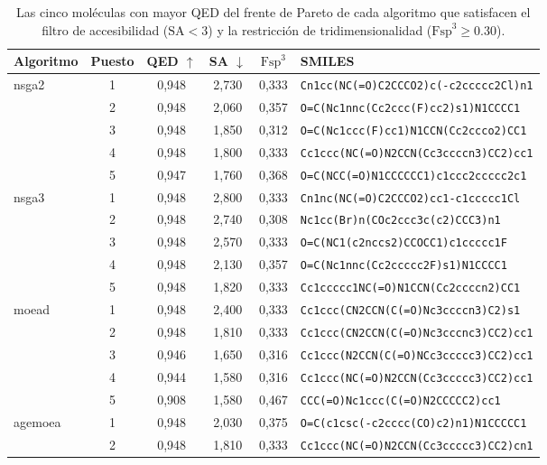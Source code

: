 \begin{table}[H]
\centering
\caption{Las cinco moléculas con mayor QED del frente de Pareto de cada algoritmo que satisfacen el filtro de accesibilidad ($\text{SA} < 3$) y la restricción de tridimensionalidad ($\text{Fsp}^3 \ge 0.30$).}
\label{tab:moleculas_representativas_completo}
\begin{tabular}{lccccl}
\toprule
Algoritmo & Puesto & QED $\uparrow$ & SA $\downarrow$ & $\text{Fsp}^3$ & SMILES \\
\midrule
\multirow{5}{*}{\acrshort{nsga2}}
 & 1 & 0,948 & 2,730 & 0,333 & \texttt{Cn1cc(NC(=O)C2CCCO2)c(-c2ccccc2Cl)n1} \\
 & 2 & 0,948 & 2,060 & 0,357 & \texttt{O=C(Nc1nnc(Cc2ccc(F)cc2)s1)N1CCCC1} \\
 & 3 & 0,948 & 1,850 & 0,312 & \texttt{O=C(Nc1ccc(F)cc1)N1CCN(Cc2ccco2)CC1} \\
 & 4 & 0,948 & 1,800 & 0,333 & \texttt{Cc1ccc(NC(=O)N2CCN(Cc3ccccn3)CC2)cc1} \\
 & 5 & 0,947 & 1,760 & 0,368 & \texttt{O=C(NCC(=O)N1CCCCCC1)c1ccc2ccccc2c1} \\
\midrule
\multirow{5}{*}{\acrshort{nsga3}}
 & 1 & 0,948 & 2,800 & 0,333 & \texttt{Cn1nc(NC(=O)C2CCCO2)cc1-c1ccccc1Cl} \\
 & 2 & 0,948 & 2,740 & 0,308 & \texttt{Nc1cc(Br)n(COc2ccc3c(c2)CCC3)n1} \\
 & 3 & 0,948 & 2,570 & 0,333 & \texttt{O=C(NC1(c2nccs2)CCOCC1)c1ccccc1F} \\
 & 4 & 0,948 & 2,130 & 0,357 & \texttt{O=C(Nc1nnc(Cc2ccccc2F)s1)N1CCCC1} \\
 & 5 & 0,948 & 1,820 & 0,333 & \texttt{Cc1ccccc1NC(=O)N1CCN(Cc2ccccn2)CC1} \\
\midrule
\multirow{5}{*}{\acrshort{moead}}
 & 1 & 0,948 & 2,400 & 0,333 & \texttt{Cc1ccc(CN2CCN(C(=O)Nc3ccccn3)C2)s1} \\
 & 2 & 0,948 & 1,810 & 0,333 & \texttt{Cc1ccc(CN2CCN(C(=O)Nc3cccnc3)CC2)cc1} \\
 & 3 & 0,946 & 1,650 & 0,316 & \texttt{Cc1ccc(N2CCN(C(=O)NCc3ccccc3)CC2)cc1} \\
 & 4 & 0,944 & 1,580 & 0,316 & \texttt{Cc1ccc(NC(=O)N2CCN(Cc3ccccc3)CC2)cc1} \\
 & 5 & 0,908 & 1,580 & 0,467 & \texttt{CCC(=O)Nc1ccc(C(=O)N2CCCCC2)cc1} \\
\midrule
\multirow{5}{*}{\acrshort{agemoea}}
 & 1 & 0,948 & 2,030 & 0,375 & \texttt{O=C(c1csc(-c2cccc(CO)c2)n1)N1CCCCC1} \\
 & 2 & 0,948 & 1,810 & 0,333 & \texttt{Cc1ccc(NC(=O)N2CCN(Cc3ccccc3)CC2)cn1} \\

\end{tabular}
\end{table}
